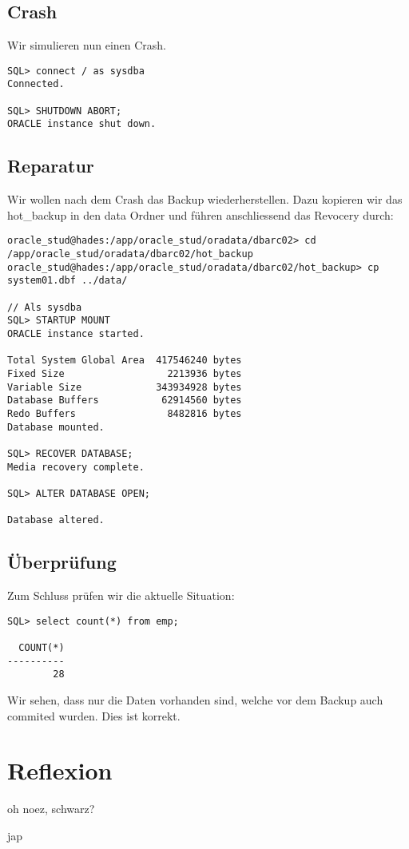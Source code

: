 \documentclass[11pt,a4paper,parskip=half]{scrartcl}
\begin{document}
\subsection{Crash}
Wir simulieren nun einen Crash.

\begin{lstlisting}
SQL> connect / as sysdba
Connected.

SQL> SHUTDOWN ABORT;
ORACLE instance shut down.
\end{lstlisting}

\subsection{Reparatur}
Wir wollen nach dem Crash das Backup wiederherstellen. Dazu kopieren wir das hot\_backup in den data Ordner und führen anschliessend das Revocery durch:
\begin{lstlisting}
oracle_stud@hades:/app/oracle_stud/oradata/dbarc02> cd /app/oracle_stud/oradata/dbarc02/hot_backup
oracle_stud@hades:/app/oracle_stud/oradata/dbarc02/hot_backup> cp system01.dbf ../data/

// Als sysdba
SQL> STARTUP MOUNT
ORACLE instance started.

Total System Global Area  417546240 bytes
Fixed Size                  2213936 bytes
Variable Size             343934928 bytes
Database Buffers           62914560 bytes
Redo Buffers                8482816 bytes
Database mounted.

SQL> RECOVER DATABASE;
Media recovery complete.

SQL> ALTER DATABASE OPEN;

Database altered.
\end{lstlisting}
\subsection{Überprüfung}
Zum Schluss prüfen wir die aktuelle Situation:

\begin{lstlisting}
SQL> select count(*) from emp;

  COUNT(*)
----------
        28
\end{lstlisting}

Wir sehen, dass nur die Daten vorhanden sind, welche vor dem Backup auch commited wurden. Dies ist korrekt.
\section{Reflexion}
oh noez, schwarz?

jap
\end{document}
